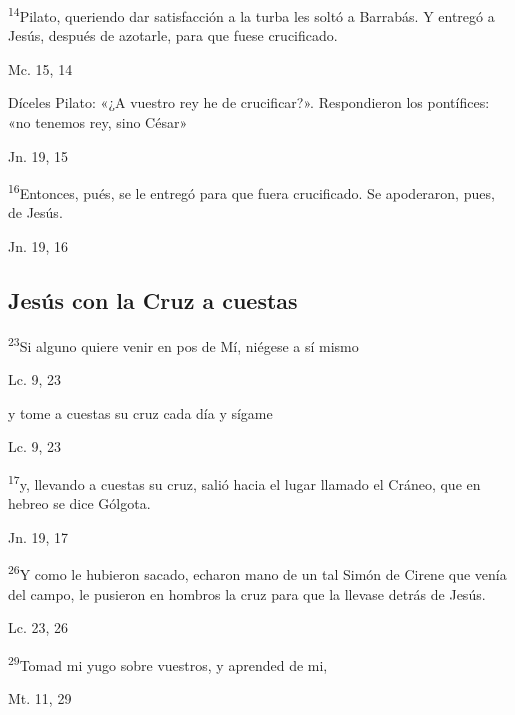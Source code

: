 \documentclass[a4paper,11pt]{article}
\begin{document}
      \textsuperscript{14}Pilato, queriendo dar satisfacción a la turba les soltó a Barrabás. Y entregó a Jesús, después de azotarle, para que fuese crucificado.
      \begin{flushright}
        Mc. 15, 14
      \end{flushright}

      Díceles Pilato: «¿A vuestro rey he de crucificar?». Respondieron los pontífices: «no tenemos rey, sino César»
      \begin{flushright}
        Jn. 19, 15
      \end{flushright}

      \textsuperscript{16}Entonces, pués, se le entregó para que fuera crucificado. Se apoderaron, pues, de Jesús.
      \begin{flushright}
        Jn. 19, 16
      \end{flushright}

    \subsection*{\hfil Jesús con la Cruz a cuestas \hfil}
      
      \textsuperscript{23}Si alguno quiere venir en pos de Mí, niégese a sí mismo
      \begin{flushright}
        Lc. 9, 23
      \end{flushright}

      y tome a cuestas su cruz cada día y sígame
      \begin{flushright}
        Lc. 9, 23
      \end{flushright}

      \textsuperscript{17}y, llevando a cuestas su cruz, salió hacia el lugar llamado el Cráneo, que en hebreo se dice Gólgota.
      \begin{flushright}
        Jn. 19, 17
      \end{flushright}

      \textsuperscript{26}Y como le hubieron sacado, echaron mano de un tal Simón de Cirene que venía del campo, le pusieron en hombros la cruz para que la llevase
      detrás de Jesús.
      \begin{flushright}
        Lc. 23, 26
      \end{flushright}

      \textsuperscript{29}Tomad mi yugo sobre vuestros, y aprended de mi, 
      \begin{flushright}
        Mt. 11, 29  
      \end{flushright}
\end{document}
